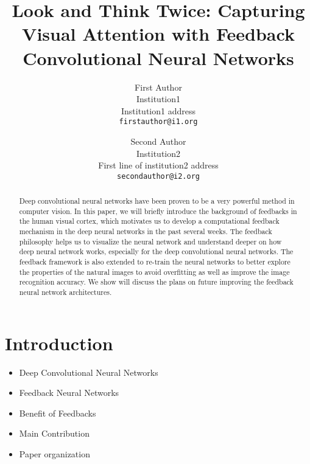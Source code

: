 \documentclass[10pt,twocolumn,letterpaper]{article}
\begin{document}
\title{Look and Think Twice: Capturing Visual Attention with Feedback Convolutional Neural Networks}
\author{First Author\\
Institution1\\
Institution1 address\\
{\tt\small firstauthor@i1.org}
\and
Second Author\\
Institution2\\
First line of institution2 address\\
{\tt\small secondauthor@i2.org}
}

\maketitle

\begin{abstract}
Deep convolutional neural networks have been proven to be a very powerful method in computer vision. In this paper, we will briefly introduce the background of feedbacks in the human visual cortex, which motivates us to develop a computational feedback mechanism in the deep neural networks in the past several weeks. The feedback philosophy helps us to visualize the neural network and understand deeper on how deep neural network works, especially for the deep convolutional neural networks. The feedback framework is also extended to re-train the neural networks to better explore the properties of the natural images to avoid overfitting as well as improve the image recognition accuracy. We show will discuss the plans on future improving the feedback neural network architectures.
\end{abstract}

\section{Introduction}
\begin{itemize}
  \item Deep Convolutional Neural Networks
  \item Feedback Neural Networks
  \item Benefit of Feedbacks
  \item Main Contribution
  \item Paper organization
\end{itemize}
\end{document}
